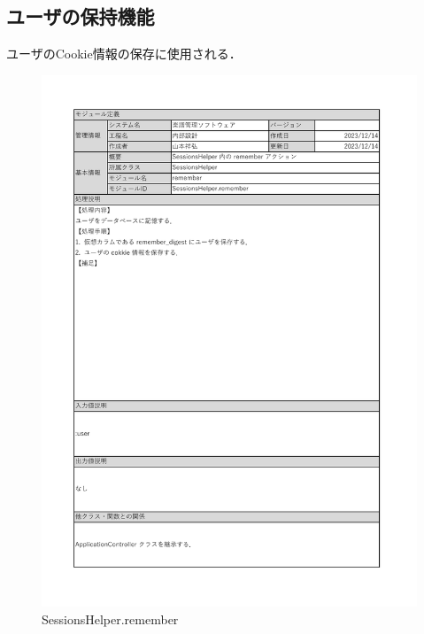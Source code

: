 \subsection*{ユーザの保持機能}
ユーザのCookie情報の保存に使用される．
\begin{figure}[H]
    \centering
    \includegraphics[scale=0.5]{img/Helper/SessionsHelper.remember.pdf}
    \caption{SessionsHelper.remember}
\end{figure}
\clearpage

